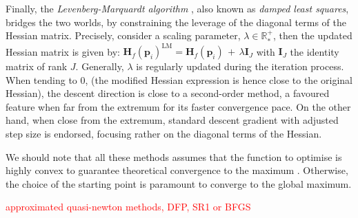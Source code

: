 \documentclass[long, final]{jobim}
\newcommand \RR {\mathbb{R}}
\begin{document}
Finally, the \textit{Levenberg-Marquardt algorithm} \citep{levenberg44, marquardt63}, also known as \textit{damped least squares}, bridges the two worlds, by constraining the leverage of the diagonal terms of the Hessian matrix. Precisely, consider a scaling parameter, $\lambda \in \RR^+_*$, then the updated Hessian matrix is given by: $\mathbf{H}_f(\boldsymbol{p}_i)^{\text{LM}}=\mathbf{H}_f(\boldsymbol{p}_i) \, + \, \lambda \boldsymbol{I}_J$ with $\boldsymbol{I}_J$ the identity matrix of rank $J$. Generally, $\lambda$ is regularly updated during the iteration process. When tending to 0, (the modified Hessian expression is hence close to the original Hessian), the descent direction is close to a second-order method, a favoured feature when far from the extremum for its faster convergence pace. On the other hand, when close from the extremum, standard descent gradient with adjusted step size is endorsed, focusing rather on the diagonal terms of the Hessian.


We should note that all these methods assumes that the function to optimise is highly convex to guarantee theoretical convergence to the maximum \citep{solomon15, boyd_etal04}. Otherwise, the choice of the starting point is paramount to converge to the global maximum.



\textcolor{red}{approximated quasi-newton methods, DFP, SR1 or BFGS}



\end{document}
